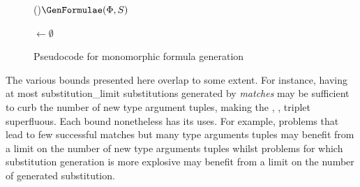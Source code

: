 \documentclass[runningheads]{llncs}
\begin{document}
\begin{figure}[t]
\begin{algorithm}[H]
\Fn(){\(\GenFormulae(\Phi, S)\)}{




   \BlankLine

   \NewFormulae \(\leftarrow\emptyset\)\;

   \BlankLine


   \BlankLine

   \Return \NewFormulae
}
\end{algorithm}
\caption{Pseudocode for monomorphic formula generation}
\label{gen_formulae}
\end{figure}


The various bounds presented here overlap to some extent. For instance, having at most \textcolor{ourblueviolet}{substitution\_limit} substitutions generated by \emph{matches} may be sufficient to curb the number of new type argument tuples, making the \textcolor{ourblueviolet}{\MonoCap}, \textcolor{ourblueviolet}{\MonoMult}, \textcolor{ourblueviolet}{\MonoFloor} triplet superfluous. Each bound nonetheless has its uses. For example, problems that lead to few successful matches but many type arguments tuples may benefit from a limit on the number of new type arguments tuples whilst problems for which substitution generation is more explosive may benefit from a limit on the number of generated substitution.
\end{document}
